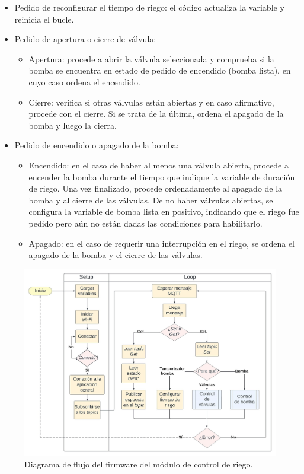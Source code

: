 \begin{itemize}
\item Pedido de reconfigurar el tiempo de riego: el código actualiza la variable y reinicia el bucle.

\item Pedido de apertura o cierre de válvula:
    \begin{itemize}
    \item Apertura: procede a abrir la válvula seleccionada y  comprueba si la bomba se encuentra en estado de pedido de encendido (bomba lista), en cuyo caso ordena el encendido.
    \item Cierre: verifica si otras válvulas están abiertas y en caso afirmativo, procede con el cierre. Si se trata de la última, ordena el apagado de la bomba y luego la cierra.
    
    \end{itemize}

\item Pedido de encendido o apagado de la bomba:
    \begin{itemize}
    \item Encendido: en el caso de haber al menos una válvula abierta, procede a encender la bomba durante el tiempo que indique la variable de duración de riego. Una vez finalizado, procede ordenadamente al apagado de la bomba y al cierre de las válvulas. De no haber válvulas abiertas, se configura la variable de bomba lista en positivo, indicando que el riego fue pedido pero aún no están dadas las condiciones para habilitarlo.
    \item Apagado: en el caso de requerir una interrupción en el riego, se ordena el apagado de la bomba y el cierre de las válvulas.
    
    \end{itemize}



\end{itemize}


\begin{figure}[!h]
	\centering
	\includegraphics[width=1.0\textwidth]{./Figures/chapter3/FirmwareRiegoControl.jpg}
	\caption[Diagrama de flujo del firmware del módulo de control de riego]{Diagrama de flujo del firmware del módulo de control de riego.}
	\label{fig:flow_riegocontrol}
\end{figure}


